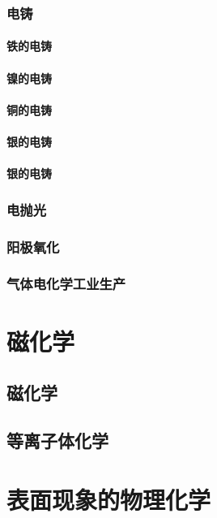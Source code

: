 \documentclass[UTF8]{../03-Chemistry}
\begin{document}
    \subsection{电铸}
        \subsubsection{铁的电铸}
        \subsubsection{镍的电铸}
        \subsubsection{铜的电铸}
        \subsubsection{银的电铸}
        \subsubsection{银的电铸}
    \subsection{电抛光}
    \subsection{阳极氧化}
    \subsection{气体电化学工业生产}




\chapter{磁化学}
\section{磁化学}
\section{等离子体化学}



\chapter{表面现象的物理化学}
\end{document}
